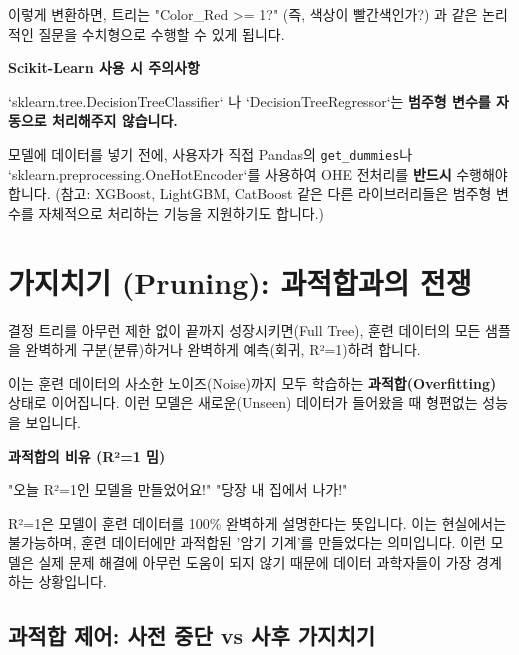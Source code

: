 \documentclass[11pt,a4paper]{book}
\theoremstyle{definition}
\begin{document}
이렇게 변환하면, 트리는 "Color\_Red >= 1?" (즉, 색상이 빨간색인가?) 과 같은 논리적인 질문을 수치형으로 수행할 수 있게 됩니다.

\begin{boxWarning}
    \textbf{Scikit-Learn 사용 시 주의사항}
    
    `sklearn.tree.DecisionTreeClassifier` 나 `DecisionTreeRegressor`는 \textbf{범주형 변수를 자동으로 처리해주지 않습니다.}
    
    모델에 데이터를 넣기 전에, 사용자가 직접 Pandas의 \texttt{get\_dummies}나 `sklearn.preprocessing.OneHotEncoder`를 사용하여 OHE 전처리를 \textbf{반드시} 수행해야 합니다.
    (참고: XGBoost, LightGBM, CatBoost 같은 다른 라이브러리들은 범주형 변수를 자체적으로 처리하는 기능을 지원하기도 합니다.)
\end{boxWarning}


\section{가지치기 (Pruning): 과적합과의 전쟁}

결정 트리를 아무런 제한 없이 끝까지 성장시키면(Full Tree), 훈련 데이터의 모든 샘플을 완벽하게 구분(분류)하거나 완벽하게 예측(회귀, R²=1)하려 합니다.

이는 훈련 데이터의 사소한 노이즈(Noise)까지 모두 학습하는 \textbf{과적합(Overfitting)} 상태로 이어집니다. 이런 모델은 새로운(Unseen) 데이터가 들어왔을 때 형편없는 성능을 보입니다.

\begin{boxExample}
    \textbf{과적합의 비유 (R²=1 밈)}
    
    "오늘 R²=1인 모델을 만들었어요!"
    "당장 내 집에서 나가!"
    
    R²=1은 모델이 훈련 데이터를 100\% 완벽하게 설명한다는 뜻입니다. 이는 현실에서는 불가능하며, 훈련 데이터에만 과적합된 '암기 기계'를 만들었다는 의미입니다. 이런 모델은 실제 문제 해결에 아무런 도움이 되지 않기 때문에 데이터 과학자들이 가장 경계하는 상황입니다.
\end{boxExample}

\subsection{과적합 제어: 사전 중단 vs 사후 가지치기}
\end{document}
